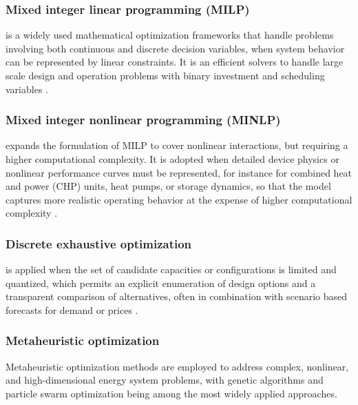 \documentclass[12pt,a4paper]{report}
\begin{document}
\subsubsection{Mixed integer linear programming (MILP)} is a widely used mathematical optimization frameworks that handle problems involving both continuous and discrete decision variables, when system behavior can be represented by linear constraints. It is an efficient solvers to handle large scale design and operation problems with binary investment and scheduling variables \cite{dangelo2025technoeconomic,Godlonton2024Synthesis}.

\subsubsection{Mixed integer nonlinear programming (MINLP)} expands the formulation of MILP to cover nonlinear interactions, but requiring a higher computational complexity. It is adopted when detailed device physics or nonlinear performance curves must be represented, for instance for combined heat and power (CHP) units, heat pumps, or storage dynamics, so that the model captures more realistic operating behavior at the expense of higher computational complexity \cite{geramimoghaddam2016comprehensive}.

\subsubsection{Discrete exhaustive optimization} is applied when the set of candidate capacities or configurations is limited and quantized, which permits an explicit enumeration of design options and a transparent comparison of alternatives, often in combination with scenario based forecasts for demand or prices \cite{dangelo2025modelling}.

\subsubsection{Metaheuristic optimization}
Metaheuristic optimization methods are employed to address complex, nonlinear, and high-dimensional energy system problems, with genetic algorithms and particle swarm optimization being among the most widely applied approaches.
\end{document}
